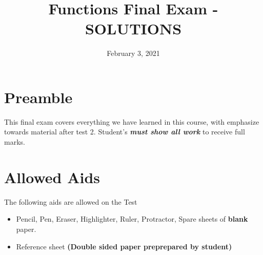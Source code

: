 \documentclass[12pt]{article} %
\title{Functions Final Exam - SOLUTIONS}
\date{February 3, 2021}
\begin{document}
    \renewcommand*{\coursecode}{MCR3U Quiz} %
    \renewcommand*{\assgnnumber}{1} %
    \renewcommand*{\submdate}{November, 2021} %
    \renewcommand*{\studentfname}{\textbf{Name:}} %
    \renewcommand*{\studentlname}{} %

    \renewcommand\qedsymbol{$\blacksquare$}
    \setfigpath
    \fancyhfoffset[L,O]{0pt} %




	\maketitle
	\section{Preamble}
	This final exam covers everything we have learned in this course, with emphasize towards material after test 2. 
  Student's \emph{\textbf{must show all work}} to receive full marks.
	\section{Allowed Aids}
	The following aids are allowed on the Test
	\begin{itemize}
		\item Pencil, Pen, Eraser, Highlighter, Ruler, Protractor, Spare sheets of \textbf{blank} paper.
		\item Reference sheet \textbf{(Double sided paper preprepared by student)}
	\end{itemize}
\end{document}
